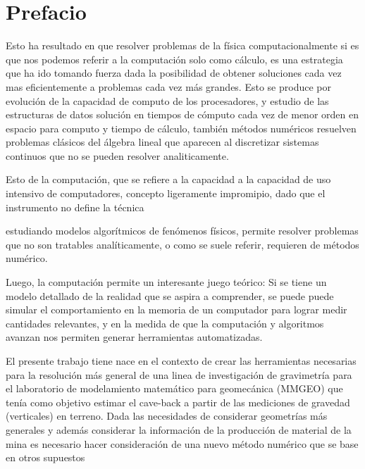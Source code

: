 
\section{Prefacio}



Esto ha resultado en que resolver problemas de la física computacionalmente si es que nos
podemos referir a la computación solo como cálculo, es
una estrategia que ha ido tomando fuerza dada la
posibilidad de obtener soluciones cada vez mas eficientemente a problemas cada vez más grandes. Esto se
produce por evolución de la capacidad de computo de los procesadores,
y estudio de las estructuras de datos 
solución en tiempos de cómputo cada vez de menor orden en espacio para computo y tiempo de cálculo, también métodos numéricos resuelven problemas clásicos del álgebra lineal que aparecen al discretizar sistemas continuos que no se pueden resolver analiticamente.






Esto de la computación, que se refiere a la capacidad a la capacidad de uso
intensivo de computadores, concepto ligeramente impromipio, dado que
el instrumento no define la técnica 

estudiando modelos algorítmicos de 
fenómenos físicos, permite resolver problemas que no son tratables 
analíticamente, o como se suele referir, requieren de métodos numérico.

Luego, la computación permite un interesante juego teórico: Si se tiene un
modelo detallado de la realidad que se aspira a comprender, se puede puede
simular el comportamiento en la memoria de un computador para lograr medir
cantidades relevantes, y en la medida de que la computación y
algoritmos avanzan nos permiten generar herramientas automatizadas.


El presente trabajo tiene nace en el contexto de crear las
herramientas necesarias para la resolución más general de una linea de
investigación de gravimetría para el laboratorio de modelamiento
matemático para geomecánica (MMGEO) que tenía como objetivo estimar el
cave-back a partir de las mediciones de gravedad (verticales) en
terreno. Dada las necesidades de considerar geometrías más generales y
además considerar la información de la producción de material de la
mina es necesario hacer consideración de una nuevo método numérico que
se base en otros supuestos %

